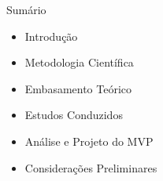 \begin{frame}{{\sffamily Sumário}}

\begin{block}{}
	\begin{itemize}%
	    \item Introdução
	    \item Metodologia Científica
	    \item Embasamento Teórico  
	    \item Estudos Conduzidos
	    \item Análise e Projeto do MVP
	    \item Considerações Preliminares
	\end{itemize}
\end{block}
\end{frame}


	    
	    
	   
	        
	        

